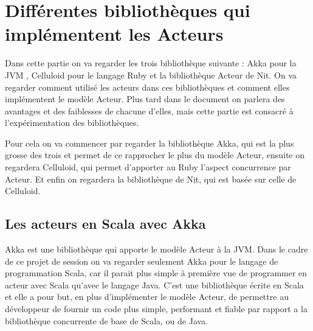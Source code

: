 \documentclass[12pt, a4paper]{article}
\begin{document}
\section{Différentes bibliothèques qui implémentent les Acteurs}
Dans cette partie on va regarder les trois bibliothèque suivante : Akka pour la JVM , Celluloid pour le langage Ruby et la bibliothèque Acteur de Nit. On va regarder comment utilisé les acteurs dans ces bibliothèques et comment elles implémentent le modèle Acteur. Plus tard dans le document on parlera des avantages et des faiblesses de chacune d'elles, mais cette partie est consacré à l'expérimentation des bibliothèques. 
\par Pour cela on va commencer par regarder la bibliothèque Akka, qui est la plus grosse des trois et permet de ce rapprocher le plus du modèle Acteur, ensuite on regardera Celluloid, qui permet d'apporter au Ruby l'aspect concurrence par Acteur. Et enfin on regardera la bibliothèque de Nit, qui est basée sur celle de Celluloid.

\subsection{Les acteurs en Scala avec Akka}
Akka est une bibliothèque qui apporte le modèle Acteur à la JVM. Dans le cadre de ce projet de session on va regarder seulement Akka pour le langage de programmation Scala, car il parait plus simple à première vue de programmer en acteur avec Scala qu'avec le langage Java. C'est une bibliothèque écrite en Scala et elle a pour but, en plus d'implémenter le modèle Acteur, de permettre au développeur de fournir un code plus simple, performant et fiable par rapport a la bibliothèque concurrente de base de Scala, ou de Java.
\end{document}
